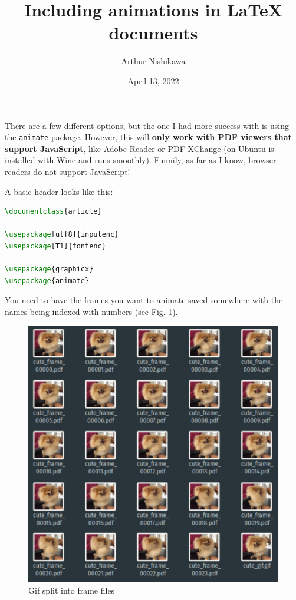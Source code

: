 \documentclass{article}
\title{Including animations in \LaTeX{} documents}
\author{Arthur Nishikawa}
\date{April 13, 2022}
\begin{document}
\maketitle

There are a few different options, but the one I had more success with is using the \verb+animate+ package. However, this will \textbf{only work with PDF viewers that support JavaScript}, like \href{https://www.adobe.com/acrobat/pdf-reader.html}{Adobe Reader} or \href{https://pdf-xchange.eu/pdf-xchange-editor/}{PDF-XChange} (on Ubuntu is installed with Wine and runs smoothly). Funnily, as far as I know, browser readers do not support JavaScript!

A basic header looks like this:

\begin{minipage}{\linewidth}
\begin{lstlisting}[language=tex]
\documentclass{article}

\usepackage[utf8]{inputenc}
\usepackage[T1]{fontenc}

\usepackage{graphicx}
\usepackage{animate}
\end{lstlisting}
\end{minipage}

You need to have the frames you want to animate saved somewhere with the names being indexed with numbers (see Fig. \ref{fig:gif_files}).

\begin{figure}[ht]
  \centering
  \includegraphics[width=.9\textwidth]{img/frame_files.pdf}
  \caption{Gif split into frame files}
  \label{fig:gif_files}
\end{figure}
\end{document}
